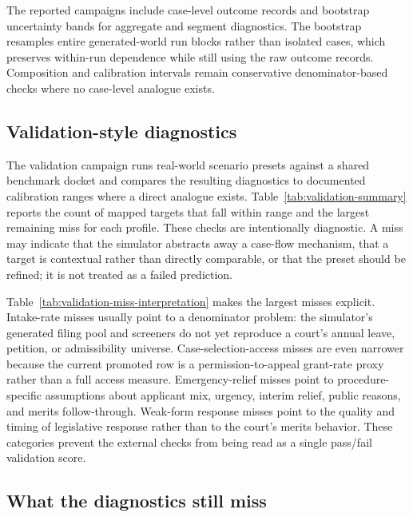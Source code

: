 \documentclass[
  journal=small,
  manuscript=research-article,
  year=2026
]{cup-journal}
\begin{document}


The reported campaigns include case-level outcome records and bootstrap uncertainty bands for aggregate and segment diagnostics. The bootstrap resamples entire generated-world run blocks rather than isolated cases, which preserves within-run dependence while still using the raw outcome records. Composition and calibration intervals remain conservative denominator-based checks where no case-level analogue exists.

\subsection{Validation-style diagnostics}

The validation campaign runs real-world scenario presets against a shared benchmark docket and compares the resulting diagnostics to documented calibration ranges where a direct analogue exists. Table~\ref{tab:validation-summary} reports the count of mapped targets that fall within range and the largest remaining miss for each profile. These checks are intentionally diagnostic. A miss may indicate that the simulator abstracts away a case-flow mechanism, that a target is contextual rather than directly comparable, or that the preset should be refined; it is not treated as a failed prediction.



Table~\ref{tab:validation-miss-interpretation} makes the largest misses explicit. Intake-rate misses usually point to a denominator problem: the simulator's generated filing pool and screeners do not yet reproduce a court's annual leave, petition, or admissibility universe. Case-selection-access misses are even narrower because the current promoted row is a permission-to-appeal grant-rate proxy rather than a full access measure. Emergency-relief misses point to procedure-specific assumptions about applicant mix, urgency, interim relief, public reasons, and merits follow-through. Weak-form response misses point to the quality and timing of legislative response rather than to the court's merits behavior. These categories prevent the external checks from being read as a single pass/fail validation score.



\subsection{What the diagnostics still miss}
\end{document}
